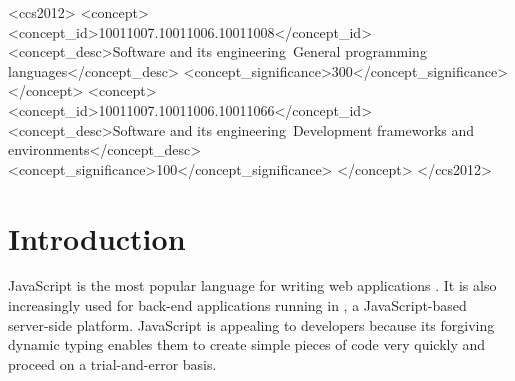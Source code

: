 \documentclass[sigplan,screen]{acmart}
\begin{document}
\begin{CCSXML}
<ccs2012>
  <concept>
    <concept_id>10011007.10011006.10011008</concept_id>
    <concept_desc>Software and its engineering~General programming languages</concept_desc>
    <concept_significance>300</concept_significance>
    </concept>
  <concept>
    <concept_id>10011007.10011006.10011066</concept_id>
    <concept_desc>Software and its engineering~Development frameworks and environments</concept_desc>
    <concept_significance>100</concept_significance>
  </concept>
</ccs2012>
\end{CCSXML}




\maketitle

\section{Introduction}
\label{sec:introduction}
JavaScript is the most popular language for writing web
applications \cite{github-statistics}. It is also increasingly used
for back-end applications running in \NodeJS{}, a JavaScript-based
server-side platform. JavaScript is appealing to developers because
its forgiving dynamic typing enables 
them to create simple pieces of code very quickly and proceed on a
trial-and-error basis.
\end{document}
